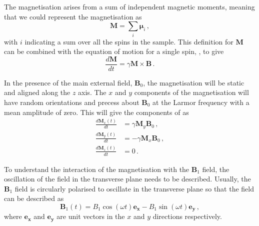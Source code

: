 The magnetisation arises from a sum of independent magnetic moments, meaning that we could represent the magnetisation as 
\begin{equation}
	\mathbf{M} = \sum_i \boldsymbol{\mu}_i \,,
        \label{eq:net_magnetisation}
\end{equation}
with $i$ indicating a sum over all the spins in the sample.
This definition for $\mathbf{M}$ can be combined with the equation of motion for a single spin, , to give \cite{Haacke1999}
\begin{equation}
	\frac{d\mathbf{M}}{dt} = \gamma \mathbf{M} \times \mathbf{B}\,.
	\label{eq:dMdt}
\end{equation}  

In the presence of the main external field, $\mathbf{B}_0$, the magnetisation will be static and aligned along the $z$ axis. The $x$ and $y$ components of the magnetisation will have random orientations and precess about $\mathbf{B}_0$ at the Larmor frequency with a mean amplitude of zero. This will give the components of  as\cite{DeGraaf2007}
\begin{align}
	\frac{d\mathbf{M}_x(t)}{dt} &= \gamma\mathbf{M}_y\mathbf{B}_0\,,\\
	\frac{d\mathbf{M}_y(t)}{dt} &= -\gamma\mathbf{M}_x\mathbf{B}_0\,,\\	\frac{d\mathbf{M}_z(t)}{dt} &= 0 \,.
\end{align}

To understand the interaction of the magnetisation with the $\mathbf{B}_1$ field, the oscillation of the field in the transverse plane needs to be described. 
%
Usually, the $\mathbf{B}_1$ field is circularly polarised to oscillate in the transverse plane so that the field can be described as
\begin{equation}
	\mathbf{B}_1(t) = B_1\cos(\omega t) \mathbf{e_x} - B_1\sin(\omega t) \mathbf{e_y}\,,
	\label{eq:circB1}
\end{equation}
where $\mathbf{e_x}$ and $\mathbf{e_y}$ are unit vectors in the $x$ and $y$ directions respectively. 



